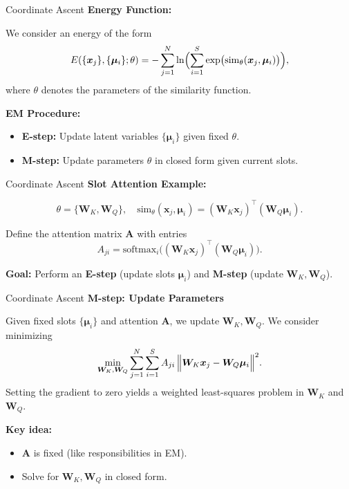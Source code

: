 \documentclass{beamer}
\begin{document}
\begin{frame}{Coordinate Ascent}
    \large
    \textbf{Energy Function:}
    
    We consider an energy of the form
    \[
    E(\{\bm{x}_j\}, \{\bm{\mu}_i\}; \theta)
    =
    -\sum_{j=1}^N
    \ln\Bigl(\sum_{i=1}^S
    \exp\bigl(\mathrm{sim}_\theta(\bm{x}_j,\bm{\mu}_i)\bigr)\Bigr),
    \]
    where \(\theta\) denotes the parameters of the similarity function.
    
    \bigskip
    
    \textbf{EM Procedure:}
    \begin{itemize}
        \item \textbf{E-step:} Update latent variables \(\{\bm{\mu}_i\}\) given fixed \(\theta\).
        \item \textbf{M-step:} Update parameters \(\theta\) in closed form given current slots.
    \end{itemize}
    \end{frame}
    
\begin{frame}{Coordinate Ascent}
    \large
    \textbf{Slot Attention Example:}
    
    \[
    \theta = \{\bm{W}_K,\bm{W}_Q\},
    \quad
    \mathrm{sim}_\theta(\bm{x}_j,\bm{\mu}_i)
    =
    (\bm{W}_K\bm{x}_j)^\top(\bm{W}_Q\bm{\mu}_i).
    \]
    
    Define the attention matrix \(\mathbf{A}\) with entries
    \[
    A_{ji}
    =
    \mathrm{softmax}_i\!\bigl(
    (\bm{W}_K\bm{x}_j)^\top(\bm{W}_Q\bm{\mu}_i)
    \bigr).
    \]
    
    \bigskip
    \textbf{Goal:} Perform an \textbf{E-step} (update slots \(\bm{\mu}_i\)) and \textbf{M-step} (update \(\bm{W}_K,\bm{W}_Q\)).
    \end{frame}
    
\begin{frame}{Coordinate Ascent}
    \large
    \textbf{M-step: Update Parameters}
    
    Given fixed slots \(\{\bm{\mu}_i\}\) and attention \(\mathbf{A}\), we update \(\bm{W}_K, \bm{W}_Q\). We consider minimizing
    \[
    \min_{\bm{W}_K,\bm{W}_Q}
    \sum_{j=1}^N\sum_{i=1}^S
    A_{ji}\,\Bigl\|\bm{W}_K\bm{x}_j - \bm{W}_Q\bm{\mu}_i\Bigr\|^2.
    \]
    Setting the gradient to zero yields a weighted least-squares problem in \(\bm{W}_K\) and \(\bm{W}_Q\).
    
    \bigskip
    \textbf{Key idea:}
    \begin{itemize}
    \item \(\mathbf{A}\) is fixed (like responsibilities in EM).
    \item Solve for \(\bm{W}_K,\bm{W}_Q\) in closed form.
    \end{itemize}
    \end{frame}
    
\end{document}
